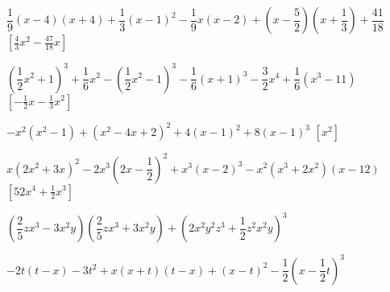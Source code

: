 \begin{esercizio}[\Ast]
\begin{enumeratea}
\(\dfrac{1}{9}(x-4)(x+4)+\dfrac{1}{3}(x-1)^{2}-\dfrac{1}{9}x(x-2)+\left(x-\dfrac{
5}{2}\right)\left(x+\dfrac{1}{3}\right)+\dfrac{41}{18}\)
  \hfill \(\left[\frac{4}{3}x^{2}-\frac{47}{18}x\right]\)
 \item 
\(\left(\dfrac{1}{2}x^{2}+1\right)^{3}+\dfrac{1}{6}x^{2}-\left(\dfrac{1}{2}x^{2}
-1\right)^{3}-\dfrac{1}{6}(x+1)^{3}-\dfrac{3}{2}x^{4}+\dfrac{1}{6}
\left(x^3-11\right)\)
  \hfill \(\left[-{\frac{1}{2}}x-\frac{1}{3}x^{2}\right]\)
 \item 
\(-x^{2}\left(x^{2}-1\right)+\left(x^{2}-4x+2\right)^{2}+4(x-1)^{2}+8(x-1)^{3}\)
  \hfill \(\left[x^2\right]\)
 \item 
\(x\left(2x^{2}+3x\right)^{2}-2x^{3}\left(2x-\dfrac{1}{2}\right)^{2}+x^{3}(x-2)^{
3}-x^{2}\left(x^{3}+2x^{2}\right)(x-12)\)
  \hfill \(\left[52x^4+\frac{1}{2}x^3\right]\)
 \item 
\(\left(\dfrac{2}{5}zx^{3}-3x^{2}y\right)\left(\dfrac{2}{5}zx^{3}+3x^{2}
y\right)+\left(2x^{2}y^{2}z^{3}+\dfrac{1}{2}z^{2}x^{2}y\right)^{3}\)
 \item 
\(-2t(t-x)-3t^{2}+x(x+t)(t-x)+(x-t)^{2}-\dfrac{1}{2}\left(x-\dfrac{1}{2}t\right)^
{3}\)
 \end{enumeratea}
\end{esercizio}

